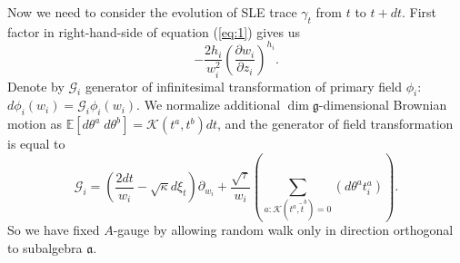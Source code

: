 \documentclass{jetpl}
\newcommand{\gf}{\mathfrak{g}}
\newcommand{\af}{\mathfrak{a}}
\begin{document}
Now we need to consider the evolution of SLE trace $\gamma_{t}$ from  $t$ to $t+ dt$. First factor in right-hand-side of equation (\ref{eq:1}) gives us
\begin{equation*}
  -\frac{2h_{i}}{w_{i}^{2}}\left(\frac{\partial w_{i}}{\partial z_{i}}\right)^{h_{i}}.
\end{equation*}
Denote by $\mathcal{G}_{i}$ generator of infinitesimal transformation of primary field $\phi_{i}$:\;$d\phi_{i}(w_{i}) = \mathcal{G}_{i}\phi_{i}(w_{i})$. We normalize additional $\dim\gf$-dimensional Brownian motion as $\mathbb{E}\left[d\theta^{a}\; d\theta^{b}\right]=\mathcal{K}(t^{a},t^{b})dt$, and the generator of field transformation is equal to 
\begin{equation}
  \mathcal{G}_{i}=\left(\frac{2dt}{w_{i}}-\sqrt{\kappa} d\xi_{t}\right) \partial_{w_{i}}+\frac{\sqrt{\tau}}{w_{i}}\left(\sum_{a:\mathcal{K}(t^{a},\tilde{t}^{b})=0}\left(d \theta ^{a} t^{a}_{i}\right)\right).
\label{eq:3}
\end{equation}
So we have fixed $A$-gauge by allowing random walk only in direction orthogonal to subalgebra $\af$. 
\end{document}
